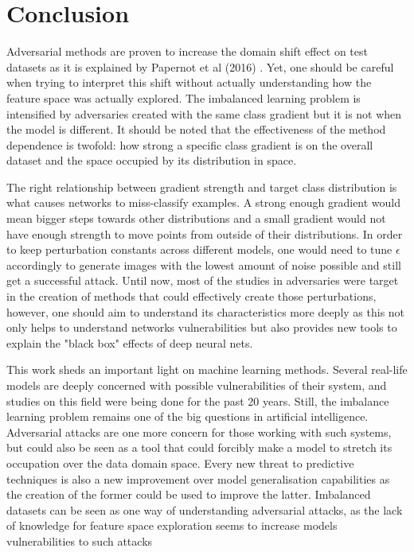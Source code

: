 \chapter{Conclusion}

Adversarial methods are proven to increase the domain shift effect on test datasets as it is explained by Papernot et al (2016) \cite{papernot2016transf}. Yet, one should be careful when trying to interpret this shift without actually understanding how the feature space was actually explored. The imbalanced learning problem is intensified by adversaries created with the same class gradient but it is not when the model is different. It should be noted that the effectiveness of the method dependence is twofold: how strong a specific class gradient is on the overall dataset and the space occupied by its distribution in space.

The right relationship between gradient strength and target class distribution is what causes networks to miss-classify examples. A strong enough gradient would mean bigger steps towards other distributions and a small gradient would not have enough strength to move points from outside of their distributions. In order to keep perturbation constants across different models, one would need to tune $\epsilon$ accordingly to generate images with the lowest amount of noise possible and still get a successful attack. Until now, most of the studies in adversaries were target in the creation of methods that could effectively create those perturbations, however, one should aim to understand its characteristics more deeply as this not only helps to understand networks vulnerabilities but also provides new tools to explain the "black box" effects of deep neural nets.

This work sheds an important light on machine learning methods. Several real-life models are deeply concerned with possible vulnerabilities of their system, and studies on this field were being done for the past 20 years. Still, the imbalance learning problem remains one of the big questions in artificial intelligence. Adversarial attacks are one more concern for those working with such systems, but could also be seen as a tool that could forcibly make a model to stretch its occupation over the data domain space. Every new threat to predictive techniques is also a new improvement over model generalisation capabilities as the creation of the former could be used to improve the latter. Imbalanced datasets can be seen as one way of understanding adversarial attacks, as the lack of knowledge for feature space exploration seems to increase models vulnerabilities to such attacks


